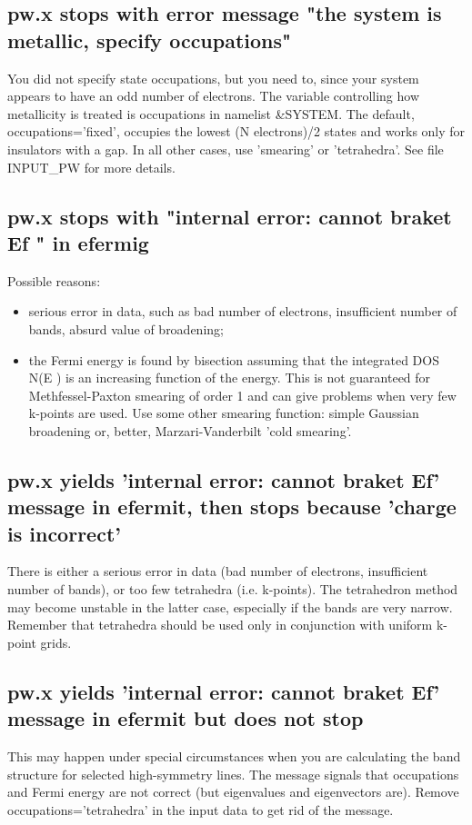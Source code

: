 \documentclass[12pt,a4paper]{article}
\begin{document}
\subsection{pw.x stops with error message "the system is metallic,
  specify occupations"} 
You did not specify state occupations, but you need to, since your
system appears to have an odd number of electrons. The variable
controlling how metallicity is treated is occupations in namelist
\&SYSTEM. The default, occupations='fixed', occupies the lowest
(N electrons)/2 states and works only for insulators with a gap. In all other
cases, use 'smearing' or 'tetrahedra'. See file INPUT\_PW for more details.

\subsection{pw.x stops with "internal error: cannot braket Ef " in efermig}
Possible reasons:
\begin{itemize}
\item serious error in data, such as bad number of electrons,
  insufficient number of bands, absurd value of broadening; 
\item the Fermi energy is found by bisection assuming that the
  integrated DOS N(E ) is an increasing function of the energy. This
  is not guaranteed for Methfessel-Paxton smearing of order 1 and can
  give problems when very few k-points are used. Use some other
  smearing function: simple Gaussian broadening or, better,
  Marzari-Vanderbilt 'cold smearing'. 
\end{itemize}

\subsection{pw.x yields 'internal error: cannot braket Ef' message in
  efermit, then stops because 'charge is incorrect'}  
There is either a serious error in data (bad number of electrons,
insufficient number of bands), or too few tetrahedra
(i.e. k-points). The tetrahedron method may become unstable in the
latter case, especially if the bands are very narrow. Remember that 
tetrahedra should be used only in conjunction with uniform k-point grids.

\subsection{pw.x yields 'internal error: cannot braket Ef' message in
  efermit but does not stop} 
This may happen under special circumstances when you are calculating
the band structure for selected high-symmetry lines. The message
signals that occupations and Fermi energy are not correct (but
eigenvalues and eigenvectors are). Remove occupations='tetrahedra' in
the input data to get rid of the message. 
\end{document}
